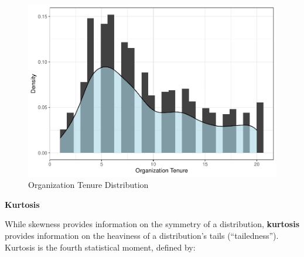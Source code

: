 \documentclass[]{book}
\newenvironment{Shaded}{\begin{snugshade}}{\end{snugshade}}
\newcommand{\CommentTok}[1]{\textcolor[rgb]{0.56,0.35,0.01}{\textit{#1}}}
\newcommand{\DataTypeTok}[1]{\textcolor[rgb]{0.13,0.29,0.53}{#1}}
\newcommand{\FloatTok}[1]{\textcolor[rgb]{0.00,0.00,0.81}{#1}}
\newcommand{\KeywordTok}[1]{\textcolor[rgb]{0.13,0.29,0.53}{\textbf{#1}}}
\newcommand{\NormalTok}[1]{#1}
\newcommand{\OperatorTok}[1]{\textcolor[rgb]{0.81,0.36,0.00}{\textbf{#1}}}
\newcommand{\StringTok}[1]{\textcolor[rgb]{0.31,0.60,0.02}{#1}}
\begin{document}
\begin{Shaded}
\end{Shaded}

\begin{figure}

{\centering \includegraphics{People_Analytics_Lifecycle_files/figure-latex/org-tenure-distribution-1} 

}

\caption{Organization Tenure Distribution}\label{fig:org-tenure-distribution}
\end{figure}

\textbf{Kurtosis}

While skewness provides information on the symmetry of a distribution, \textbf{kurtosis} provides information on the heaviness of a distribution's tails (``tailedness''). Kurtosis is the fourth statistical moment, defined by:
\end{document}
